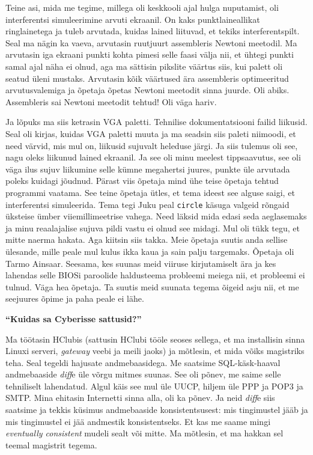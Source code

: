 Teine asi, mida me tegime, millega oli keskkooli ajal hulga nuputamist, oli
interferentsi simuleerimine arvuti ekraanil. On kaks punktlaineallikat
ringlainetega ja tuleb arvutada, kuidas lained liituvad, et tekiks
interferentspilt. Seal ma nägin ka vaeva, arvutasin ruutjuurt
assembleris Newtoni meetodil. Ma arvutasin iga ekraani
punkti kohta pimesi selle faasi välja nii, et ühtegi punkti samal ajal näha ei
olnud, aga ma sättisin pikslite väärtus siis, kui palett oli seatud üleni mustaks.
Arvutasin kõik väärtused ära assembleris optimeeritud arvutusvalemiga ja õpetaja
õpetas Newtoni meetodit sinna juurde. Oli abiks. Assembleris sai Newtoni meetodit
tehtud! Oli väga hariv.

Ja lõpuks ma siis ketrasin VGA paletti. Tehnilise dokumentatsiooni failid
liikusid. Seal oli kirjas, kuidas VGA paletti muuta ja ma seadsin siis paleti
niimoodi, et need värvid, mis mul on, liikusid sujuvalt heleduse järgi. Ja siis
tulemus oli see, nagu oleks liikunud lained ekraanil. Ja see oli minu meelest
tippsaavutus, see oli väga ilus sujuv liikumine selle kümne megahertsi juures,
punkte üle arvutada poleks kuidagi jõudnud. Pärast viis õpetaja mind ühe teise
õpetaja tehtud programmi vaatama. See teine õpetaja ütles, et tema ideest see
alguse saigi, et interferentsi simuleerida. Tema tegi Juku peal \verb|circle|
käsuga valgeid rõngaid üksteise ümber viiemillimeetrise vahega. Need läksid
mida edasi seda aeglasemaks ja minu reaalajalise sujuva pildi vastu ei olnud
see midagi. Mul oli tükk tegu, et mitte naerma hakata. Aga kiitsin siis takka.
Meie õpetaja suutis anda sellise ülesande, mille peale mul kulus ikka kaua ja
sain palju targemaks. Õpetaja oli Tarmo Ainsaar.
Seesama, kes suunas meid viiruse kirjutamiselt ära ja kes lahendas selle BIOSi
paroolide haldusteema probleemi meiega nii, et probleemi ei tulnud. Väga hea
õpetaja. Ta suutis meid suunata tegema õigeid asju nii, et me seejuures õpime
ja paha peale ei lähe.

\textbf{\enquote{Kuidas sa Cyberisse sattusid?}}

Ma töötasin HClubis (sattusin HClubi tööle seoses sellega, et ma
installisin sinna Linuxi serveri, \emph{gateway} veebi ja meili jaoks) ja
mõtlesin, et mida võiks magistriks teha. Seal tegeldi hajusate andmebaasidega.
Me saatsime SQL-käsk-haaval andmebaaside \emph{diff}e üle võrgu mitmes suunas.
See oli põnev, me saime selle tehniliselt lahendatud. Algul käis see mul üle
UUCP, hiljem üle PPP ja POP3 ja SMTP. Mina ehitasin Internetti sinna alla, oli
ka põnev. Ja neid \emph{diff}e siis saatsime ja tekkis küsimus andmebaaside
konsistentsusest: mis tingimustel jääb ja mis tingimustel ei jää andmestik
konsistentseks. Et kas me saame mingi \emph{eventually consistent} mudeli sealt
või mitte. Ma mõtlesin, et ma hakkan sel teemal magistrit tegema.

